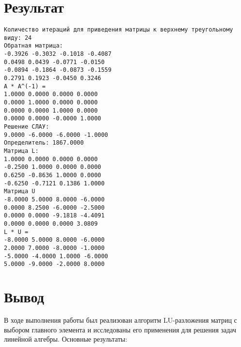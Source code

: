 \section*{Результат}

\begin{verbatim}
Количество итераций для приведения матрицы к верхнему треугольному виду: 24
Обратная матрица:
-0.3926 -0.3032 -0.1018 -0.4087 
0.0498 0.0439 -0.0771 -0.0150 
-0.0894 -0.1864 -0.0873 -0.1559 
0.2791 0.1923 -0.0450 0.3246 
A * A^(-1) =
1.0000 0.0000 0.0000 0.0000 
0.0000 1.0000 0.0000 0.0000 
0.0000 0.0000 1.0000 0.0000 
0.0000 0.0000 -0.0000 1.0000 
Решение СЛАУ:
9.0000 -6.0000 -6.0000 -1.0000 
Определитель: 1867.0000
Матрица L:
1.0000 0.0000 0.0000 0.0000 
-0.2500 1.0000 0.0000 0.0000 
0.6250 -0.8636 1.0000 0.0000 
-0.6250 -0.7121 0.1386 1.0000 
Матрица U
-8.0000 5.0000 8.0000 -6.0000 
0.0000 8.2500 -6.0000 -2.5000 
0.0000 0.0000 -9.1818 -4.4091 
0.0000 0.0000 0.0000 3.0809 
L * U =
-8.0000 5.0000 8.0000 -6.0000 
2.0000 7.0000 -8.0000 -1.0000 
-5.0000 -4.0000 1.0000 -6.0000 
5.0000 -9.0000 -2.0000 8.0000 
\end{verbatim}

\section*{Вывод}

В ходе выполнения работы был реализован алгоритм LU-разложения матриц 
с выбором главного элемента и исследованы его применения для решения задач линейной алгебры. 
Основные результаты:

